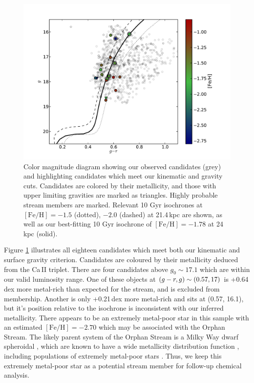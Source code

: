 \documentclass{emulateapj}
\begin{document}
\begin{figure}[h]
	\includegraphics[width=\columnwidth]{./figures/cmd.pdf}
	\caption{Color magnitude diagram showing our observed candidates (grey) and highlighting candidates which meet our kinematic and gravity cuts. Candidates are colored by their metallicity, and those with upper limiting gravities are marked as triangles. Highly probable stream members are marked. Relevant 10 Gyr \citet{Girardi;et-al_2008} isochrones at $[\mbox{Fe/H}] = -1.5$ (dotted), $-2.0$ (dashed) at 21.4\,kpc \citep{Newberg;et-al_2010} are shown, as well as our best-fitting 10 Gyr isochrone of $[\mbox{Fe/H}] = -1.78$ at 24\,kpc (solid).}
	\label{fig:cmd}
\end{figure}

Figure \ref{fig:cmd} illustrates all eighteen candidates which meet both our kinematic and surface gravity criterion. Candidates are coloured by their metallicity deduced from the Ca\,\textsc{II} triplet. There are four candidates above $g_0 \sim 17.1$ which are within our valid luminosity range. One of these objects at $(g \-- r, g) \sim (0.57, 17)$ is +0.64\,dex more metal-rich than expected for the stream, and is excluded from membership. Another is only +0.21\,dex more metal-rich and sits at (0.57, 16.1), but it's position relative to the isochrone is inconsistent with our inferred metallicity. There appears to be an extremely metal-poor star in this sample with an estimated $[\mbox{Fe/H}] = -2.70$ which may be associated with the Orphan Stream. The likely parent system of the Orphan Stream is a Milky Way dwarf spheroidal \citep{Belokurov;et-al_2007, Sales;et-al_2008}, which are known to have a wide metallicity distribution function \citep{Tolstoy;et-al_2009}, including populations of extremely metal-poor stars \citep{Kirby;et-al_2010,Frebel;et-al_2010,Tafelmeyer;et-al_2010}. Thus, we keep this extremely metal-poor star as a potential stream member for follow-up chemical analysis. 
\end{document}
